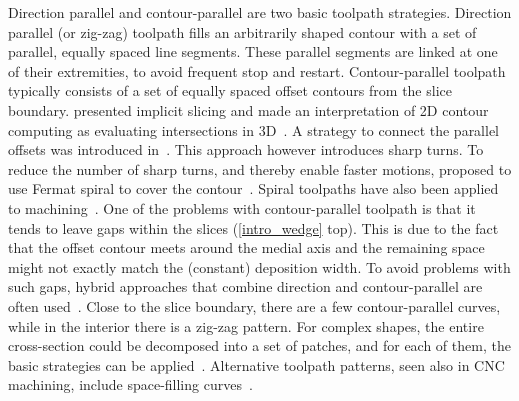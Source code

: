 Direction parallel and contour-parallel are two basic toolpath strategies.
Direction parallel (or zig-zag) toolpath fills an arbitrarily shaped contour with a set of parallel, equally spaced line segments.
These parallel segments are linked at one of their extremities, to avoid frequent stop and restart.
Contour-parallel toolpath typically consists of a set of equally spaced offset contours from the slice boundary.
\citeauthor{steuben2016implicit} presented implicit slicing and made an interpretation of 2D contour computing as evaluating intersections in 3D~\cite{steuben2016implicit}.
A strategy to connect the parallel offsets was introduced in~\cite{KUIPERS2019CAD}. This approach however introduces sharp turns.
To reduce the number of sharp turns, and thereby enable faster motions, \citeauthor{Zhao2016} proposed to use Fermat spiral to cover the contour~\cite{Zhao2016}. 
Spiral toolpaths have also been applied to machining~\cite{Held2009,Huang2017}.
One of the problems with contour-parallel toolpath is that it tends to leave gaps within the slices (\cref{intro_wedge} top).
This is due to the fact that the offset contour meets around the medial axis and the remaining space might not exactly match the (constant) deposition width.
To avoid problems with such gaps, hybrid approaches that combine direction and contour-parallel are often used~\cite{Mcmains2000DETC,Jin2013adaptive}.
Close to the slice boundary, there are a few contour-parallel curves, while in the interior there is a zig-zag pattern.
For complex shapes, the entire cross-section could be decomposed into a set of patches, and for each of them, the basic strategies can be applied~\cite{Ding2014,Jin2017RCIM}.
Alternative toolpath patterns, seen also in CNC machining, include space-filling curves~\cite{Cox1994CAD,Griffiths1994,Shaikh2016}.

